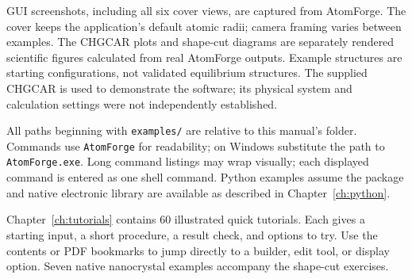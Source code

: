 \documentclass[11pt,a4paper,oneside]{report}
\newcommand{\code}[1]{\nolinkurl{#1}}
\begin{document}
GUI screenshots, including all six cover views, are captured from AtomForge. The cover keeps the application's default atomic radii; camera framing varies between examples. The CHGCAR plots and shape-cut diagrams are separately rendered scientific figures calculated from real AtomForge outputs. Example structures are starting configurations, not validated equilibrium structures. The supplied CHGCAR is used to demonstrate the software; its physical system and calculation settings were not independently established.

All paths beginning with \code{examples/} are relative to this manual's folder. Commands use \code{AtomForge} for readability; on Windows substitute the path to \code{AtomForge.exe}. Long command listings may wrap visually; each displayed command is entered as one shell command. Python examples assume the package and native electronic library are available as described in Chapter~\ref{ch:python}.

Chapter~\ref{ch:tutorials} contains 60 illustrated quick tutorials. Each gives a starting input, a short procedure, a result check, and options to try. Use the contents or PDF bookmarks to jump directly to a builder, edit tool, or display option. Seven native nanocrystal examples accompany the shape-cut exercises.

\tableofcontents
\clearpage{}













\appendix




\end{document}
